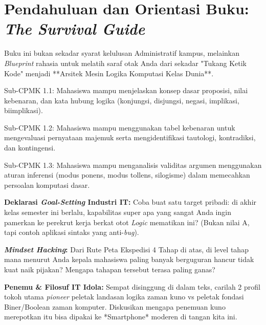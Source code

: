 \documentclass[../main]{subfiles}
\begin{document}
\chapter{Pendahuluan dan Orientasi Buku: \textit{The Survival Guide}}

Buku ini bukan sekadar syarat kelulusan Administratif kampus, melainkan \textit{Blueprint} rahasia untuk melatih saraf otak Anda dari sekadar "Tukang Ketik Kode" menjadi **Arsitek Mesin Logika Komputasi Kelas Dunia**.

\begin{subcpmk}
  \item Sub-CPMK 1.1: Mahasiswa mampu menjelaskan konsep dasar proposisi, nilai kebenaran, dan kata hubung logika (konjungsi, disjungsi, negasi, implikasi, biimplikasi).
  \item Sub-CPMK 1.2: Mahasiswa mampu menggunakan tabel kebenaran untuk mengevaluasi pernyataan majemuk serta mengidentifikasi tautologi, kontradiksi, dan kontingensi.
  \item Sub-CPMK 1.3: Mahasiswa mampu menganalisis validitas argumen menggunakan aturan inferensi (modus ponens, modus tollens, silogisme) dalam memecahkan persoalan komputasi dasar.
\end{subcpmk}






\begin{aktivitas}
  \item \textbf{Deklarasi \textit{Goal-Setting} Industri IT:} Coba buat satu target pribadi: di akhir kelas semester ini berlalu, kapabilitas super apa yang sangat Anda ingin pamerkan ke perekrut kerja berkat otot \textit{Logic} mematikan ini? (Bukan nilai A, tapi contoh aplikasi sintaks yang anti-\textit{bug}).
  \item \textbf{\textit{Mindset Hacking}:} Dari Rute Peta Ekspedisi 4 Tahap di atas, di level tahap mana menurut Anda kepala mahasiswa paling banyak berguguran hancur tidak kuat naik pijakan? Mengapa tahapan tersebut terasa paling ganas?
  \item \textbf{Penemu \& Filosuf IT Idola:} Sempat disinggung di dalam teks, carilah 2 profil tokoh utama \textit{pioneer} peletak landasan logika zaman kuno vs peletak fondasi Biner/Boolean zaman komputer. Diskusikan mengapa penemuan kuno merepotkan itu bisa dipakai ke *Smartphone* moderen di tangan kita ini.
\end{aktivitas}
\end{document}
